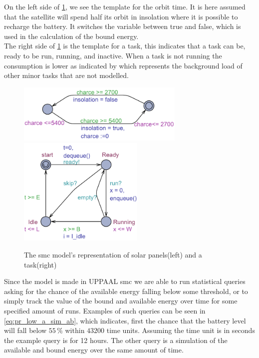 On the left side of \cref{fig:solar_task}, we see the template for the orbit time. It is here assumed that the satellite will spend half its orbit in insolation where it is possible to recharge the battery. It switches the variable  between true and false, which is used in the calculation of the bound energy.\\
The right side of \cref{fig:solar_task} is the template for a task, this indicates that a task can be, ready to be run, running, and inactive. When a task is not running the consumption is lower as indicated by  which represents the background load of other minor tasks that are not modelled.

\begin{figure}[H]%
	\centering
	\subfloat
	{{\includegraphics[width=8cm]{graphics/smc_solar.pdf} }}%
	\qquad
	\subfloat
	{{\includegraphics[width=6cm]{graphics/smc_task.pdf} }}%
	\caption{The \gls{smc} model's representation of solar panels(left) and a task(right)}%
	\label{fig:solar_task}%
\end{figure}
Since the model is made in UPPAAL \gls{smc} we are able to run statistical queries asking for the chance of the available energy falling below some threshold, or to simply track the value of the bound and available energy over time for some specified amount of runs. Examples of such queries can be seen in \cref{eq:pr_low_a_sim_ab}, which indicates, first the chance that the battery level will fall below $55\, \%$ within $43200$ time units. Assuming the time unit is in seconds the example query is for 12 hours. The other query is a simulation of the available and bound energy over the same amount of time.\\

